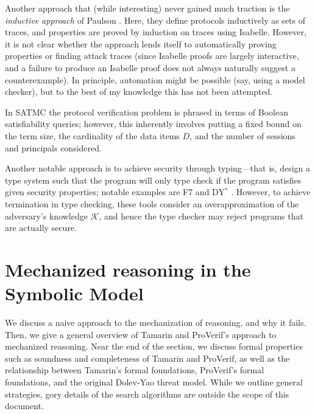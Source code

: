 \documentclass{article}
\theoremstyle{definition}
\begin{document}
Another approach that (while interesting) never gained much traction 
is the \emph{inductive approach} of Paulson \cite{inductive_approach}. 
Here, they define protocols inductively as sets of traces, 
and properties are proved by induction on traces using Isabelle. 
However, it is not clear whether the approach lends itself to automatically proving properties or finding attack traces
(since Isabelle proofs are largely interactive, 
and a failure to produce an Isabelle proof does not always naturally suggest a counterexample).
In principle, automation might be possible (say, using a model checker), but 
to the best of my knowledge this has not been attempted.

In SATMC \cite{satmc} the protocol verification problem is phrased in terms of Boolean satisfiability queries; however, this inherently involves putting a fixed bound on the term size, the cardinality of the data items $D$, and the number of sessions and principals considered.

Another notable approach is to achieve security through typing---that is, design a type system such that the program will only type check if the program satisfies given security properties; notable examples are F7 \cite{f7} and DY$^*$ \cite{dystar}. However, to achieve termination in type checking, these tools consider an overapproximation of the adversary's knowledge $\mathcal{K}$, 
and hence the type checker may reject programs that are actually secure.


\section{Mechanized reasoning in the Symbolic Model}\label{sec:mechanized-reasoning}
We discuss a naive approach to the mechanization of reasoning, and why it fails. Then, we give a general overview of Tamarin and ProVerif's approach to mechanized reasoning. 
Near the end of the section, we discuss formal properties such as soundness and completeness 
of Tamarin and ProVerif, as well as the relationship between Tamarin's formal foundations,
ProVerif's formal foundations, and the original Dolev-Yao threat model.
While we outline general strategies, gory details 
of the search algorithms are outside the scope of this document.
\end{document}

